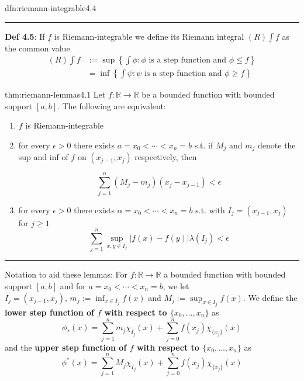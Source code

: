 \documentclass[landscape, 8pt]{extarticle}
\begin{document}
\begin{multicols}{3}
\begin{dfn}{dfn:riemann-integrable}{4.4}
	\noindent\rule{\textwidth}{0.2pt}
	\textbf{Def 4.5}: If $f$ is Riemann-integrable we define its Riemann integral $(R) \int f$ as the common value
	\begin{align*}
		(R) \int f&:= \sup \left\{\int \phi : \text{$\phi$ is a step function and $\phi \le f$}\right\} \\
		&= \inf \left\{\int \psi : \text{$\psi$ is a step function and $\phi \ge f$}\right\}
	\end{align*}
\end{dfn}

\vspace{-6pt}
\begin{thm}{thm:riemann-lemmas}{4.1}
	\vspace{-5pt}
	Let $f : \mathbb{R} \to \mathbb{R}$ be a bounded function with bounded support $[a, b]$. The following are equivalent:

	\vspace{-5pt}
	\begin{enumerate}[leftmargin=*]
	    \item $f$ is Riemann-integrable
			\vspace{-3pt}
	    \item for every $\epsilon > 0$ there exists $a = x_{0} < \cdots < x_{n} = b$ s.t. if $M_{j}$ and $m_{j}$ denote the sup and inf of $f$ on $(x_{j-1}, x_{j})$ respectively, then

			\vspace{-13pt}
			\[\sum_{j = 1}^{n}(M_{j} - m_{j})(x_{j} - x_{j - 1}) < \epsilon\]
		\item for every $\epsilon > 0$ there exists $\alpha = x_{0} < \cdots < x_{n} = b$ s.t. with $I_{j} = (x_{j-1}, x_{j})$ for $j \ge 1$
			\[\sum_{j = 1}^{n} \sup_{x,y\in I_{j}} \lvert f(x) - f(y) \rvert \lambda(I_{j}) < \epsilon\]
	\end{enumerate}

	\vspace{-5pt}
	\noindent\rule{\textwidth}{0.2pt}
	Notation to aid these lemmas: For $f : \mathbb{R}\to \mathbb{R}$ a bounded function with bounded support $[a, b]$ and for $a = x_{0} < \cdots < x_{n} = b$, we let $I_{j} = (x_{j - 1}, x_{j}),\, m_{j} := \inf_{x\in I_{j}}f(x)$ and $M_{j} := \sup_{x\in I_{j}} f(x)$. We define the \textbf{lower step function of $f$ with respect to $\{x_{0},\dots,x_{n}\}$} as
	\[\phi_{*}(x) = \sum_{j = 1}^{n} m_{j}\chi_{I_{j}}(x) + \sum_{j = 0}^{n} f(x_{j}) \chi_{\{x_{j}\}}(x)\]
	and the \textbf{upper step function of $f$ with respect to $\{x_{0},\dots,x_{n}\}$} as
	\[\phi^{*}(x) = \sum_{j = 1}^{n} M_{j}\chi_{I_{j}}(x) + \sum_{j = 0}^{n} f(x_{j}) \chi_{\{x_{j}\}}(x)\]


\end{thm}
\end{multicols}
\end{document}
